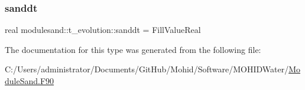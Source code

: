 \subsubsection{\texorpdfstring{sanddt}{sanddt}}
{\footnotesize\ttfamily real modulesand\+::t\+\_\+evolution\+::sanddt = Fill\+Value\+Real\hspace{0.3cm}{\ttfamily [private]}}



The documentation for this type was generated from the following file\+:\begin{DoxyCompactItemize}
\item 
C\+:/\+Users/administrator/\+Documents/\+Git\+Hub/\+Mohid/\+Software/\+M\+O\+H\+I\+D\+Water/\mbox{\hyperlink{_module_sand_8_f90}{Module\+Sand.\+F90}}\end{DoxyCompactItemize}
